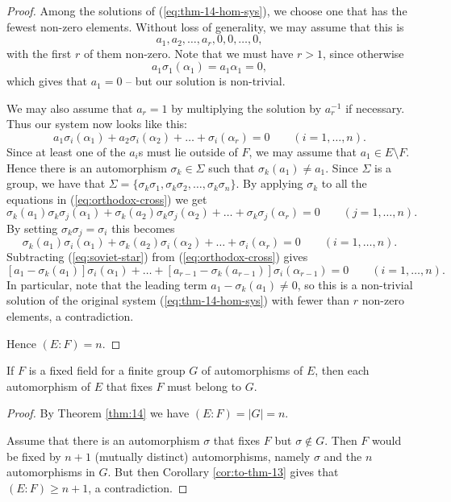 \begin{theorem}
\begin{proof}
		Among the solutions of (\ref{eq:thm-14-hom-sys}), we choose one that has the fewest non-zero elements. Without loss of generality, we may assume that this is
		\[
			a_1, a_2, \dots, a_r, 0, 0, \dots, 0,
		\]
		with the first $r$ of them non-zero. Note that we must have $r > 1$, since otherwise
		\[
			a_1 \sigma_1(\alpha_1) = a_1 \alpha_1 = 0,
		\]
		which gives that $a_1 = 0$ -- but our solution is non-trivial.
		
		We may also assume that $a_r = 1$ by multiplying the solution by $a_r^{-1}$ if necessary. Thus our system now looks like this:
		\begin{equation}\label{eq:orthodox-cross}
			a_1 \sigma_i(\alpha_1) + a_2 \sigma_i(\alpha_2) + \dots + \sigma_i(\alpha_r) = 0 \qquad (i = 1, \dots, n).
		\end{equation}
		Since at least one of the $a_i$s must lie outside of $F$, we may assume that $a_1 \in E \setminus F$. Hence there is an automorphism $\sigma_k \in \Sigma$ such that $\sigma_k(a_1) \neq a_1$. Since $\Sigma$ is a group, we have that $\Sigma = \{\sigma_k\sigma_1, \sigma_k\sigma_2, \dots, \sigma_k\sigma_n\}$. By applying $\sigma_k$ to all the equations in (\ref{eq:orthodox-cross}) we get
		\[
			\sigma_k(a_1) \sigma_k\sigma_j(\alpha_1) + \sigma_k(a_2) \sigma_k\sigma_j(\alpha_2) + \dots + \sigma_k\sigma_j(\alpha_r) = 0 \qquad (j = 1, \dots, n).
		\]
		By setting $\sigma_k\sigma_j = \sigma_i$ this becomes
		\begin{equation}\label{eq:soviet-star}
			\sigma_k(a_1) \sigma_i(\alpha_1) + \sigma_k(a_2) \sigma_i(\alpha_2) + \dots + \sigma_i(\alpha_r) = 0 \qquad (i = 1, \dots, n).
		\end{equation}
		Subtracting (\ref{eq:soviet-star}) from (\ref{eq:orthodox-cross}) gives
		\[
			[a_1 - \sigma_k(a_1)] \sigma_i(\alpha_1) + \dots + [a_{r - 1} - \sigma_k(a_{r - 1})]\sigma_i(\alpha_{r - 1}) = 0 \qquad (i = 1, \dots, n).
		\]
		In particular, note that the leading term $a_1 - \sigma_k(a_1) \neq 0$, so this is a non-trivial solution of the original system (\ref{eq:thm-14-hom-sys}) with fewer than $r$ non-zero elements, a contradiction.
		
		Hence $(E : F) = n$.
	\end{proof}
\end{theorem}

\begin{corollary}\label{cor:1}
	If $F$ is a fixed field for a finite group $G$ of automorphisms of $E$, then each automorphism of $E$ that fixes $F$ must belong to $G$.
	\begin{proof}
		By Theorem \ref{thm:14} we have $(E : F) = |G| = n$.
		
		Assume that there is an automorphism $\sigma$ that fixes $F$ but $\sigma \notin G$. Then $F$ would be fixed by $n + 1$ (mutually distinct) automorphisms, namely $\sigma$ and the $n$ automorphisms in $G$. But then Corollary \ref{cor:to-thm-13} gives that $(E : F) \geq n + 1$, a contradiction.
	\end{proof}
\end{corollary}

